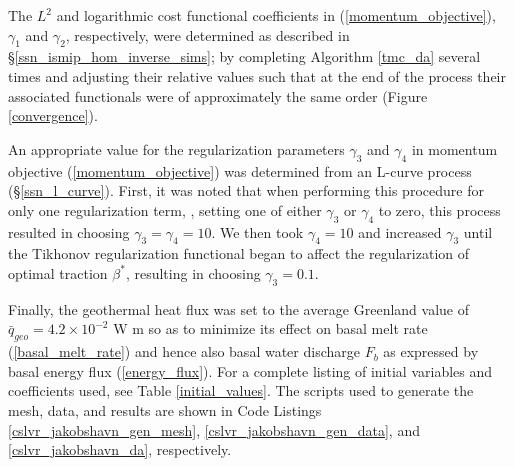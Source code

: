 The $L^2$ and logarithmic cost functional coefficients in (\ref{momentum_objective}), $\gamma_1$ and $\gamma_2$, respectively, were determined as described in \S \ref{ssn_ismip_hom_inverse_sims}; by completing Algorithm \ref{tmc_da} several times and adjusting their relative values such that at the end of the process their associated functionals were of approximately the same order (Figure \ref{convergence}).

An appropriate value for the regularization parameters $\gamma_3$ and $\gamma_4$ in momentum objective (\ref{momentum_objective}) was determined from an L-curve process (\S \ref{ssn_l_curve}).  First, it was noted that when performing this procedure for only one regularization term, \ie, setting one of either $\gamma_3$ or $\gamma_4$ to zero, this process resulted in choosing $\gamma_3 = \gamma_4 = 10$.  We then took $\gamma_4 = 10$ and increased $\gamma_3$ until the Tikhonov regularization functional began to affect the regularization of optimal traction $\beta^*$, resulting in choosing $\gamma_3 = 0.1$.

Finally, the geothermal heat flux was set to the average Greenland value of $\bar{q}_{geo} = 4.2 \times 10^{-2}$ W m \citep{paterson_1994} so as to minimize its effect on basal melt rate (\ref{basal_melt_rate}) and hence also basal water discharge $F_b$ as expressed by basal energy flux (\ref{energy_flux}).  For a complete listing of initial variables and coefficients used, see Table \ref{initial_values}.  The \CSLVR scripts used to generate the mesh, data, and results are shown in Code Listings \ref{cslvr_jakobshavn_gen_mesh}, \ref{cslvr_jakobshavn_gen_data}, and \ref{cslvr_jakobshavn_da}, respectively.

